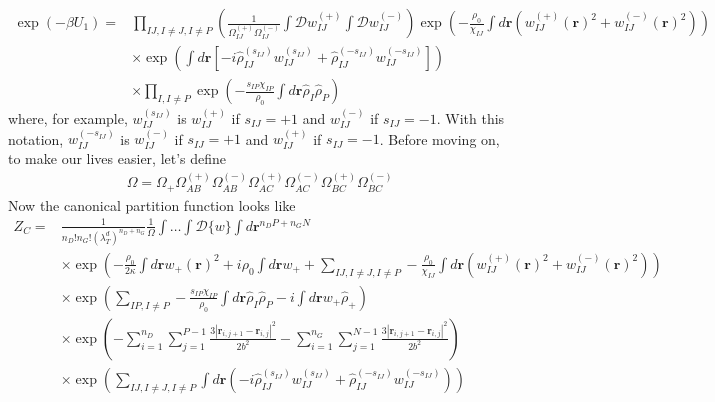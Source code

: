 \documentclass{article}
\begin{document}
\begin{align*}
  \exp (-\beta U_1) =&
    \prod_{IJ, I \ne J, I \ne P} \left(
      \frac{1}{\Omega_{IJ}^{(+)}\Omega_{IJ}^{(-)}}
      \int \mathcal{D} w_{IJ}^{(+)} \int \mathcal{D} w_{IJ}^{(-)}
    \right)
    \exp \left(
      -\frac{\rho_0}{\chi_{IJ}}
      \int d \mathbf{r} \left( 
        w_{IJ}^{(+)}(\mathbf{r})^2 + w_{IJ}^{(-)}(\mathbf{r})^2
      \right)
    \right) \\
    &\times
    \exp \left(
      \int d \mathbf{r} \left[ 
        - i \hat{\rho}_{IJ}^{(s_{IJ})} w_{IJ}^{(s_{IJ})}
        + \hat{\rho}_{IJ}^{(-s_{IJ})} w_{IJ}^{(-s_{IJ})}
      \right]
    \right) \\
    &\times
    \prod_{I, I \ne P} \exp \left(
      - \frac{s_{IP}\chi_{IP}}{\rho_0}
      \int d \mathbf{r} \hat{\rho}_I \hat{\rho}_P
    \right)
\end{align*}
where, for example, $w_{IJ}^{(s_{IJ})}$ is $w_{IJ}^{(+)}$ if $s_{IJ} = +1$ and
  $w_{IJ}^{(-)}$ if $s_{IJ} = -1$.
With this notation, $w_{IJ}^{(-s_{IJ})}$ is $w_{IJ}^{(-)}$ if $s_{IJ} = +1$ and
  $w_{IJ}^{(+)}$ if $s_{IJ} = -1$.
Before moving on, to make our lives easier, let's define
\begin{align*}
  \Omega =
    \Omega_+
    \Omega_{AB}^{(+)} \Omega_{AB}^{(-)}
    \Omega_{AC}^{(+)} \Omega_{AC}^{(-)}
    \Omega_{BC}^{(+)} \Omega_{BC}^{(-)}
\end{align*}
Now the canonical partition function looks like
\begin{align*}
  Z_C =& \frac{1}{n_D!n_G! \left( \lambda_T^d \right)^{n_D+n_G}}
    \frac{1}{\Omega}
    \int \hdots \int \mathcal{D} \{w\}
    \int d \mathbf{r}^{n_D P + n_G N} \\
    &\times
    \exp \left(
      - \frac{\rho_0}{2\kappa} \int d \mathbf{r} w_+(\mathbf{r})^2
      + i \rho_0 \int d\mathbf{r} w_+
      + \sum_{IJ,I \ne J, I \ne P}
      - \frac{\rho_0}{\chi_{IJ}}
      \int d \mathbf{r}
      \left(
        w_{IJ}^{(+)} (\mathbf{r})^2 + w_{IJ}^{(-)} (\mathbf{r})^2
      \right)
    \right) \\
    &\times
    \exp \left(
      \sum_{IP,I \ne P}
      - \frac{s_{IP}\chi_{IP}}{\rho_0}
      \int d \mathbf{r} \hat{\rho}_I \hat{\rho}_P
      - i\int d \mathbf{r} w_+ \hat{\rho}_+
    \right) \\
    &\times
    \exp \left(
      - \sum_{i=1}^{n_D} \sum_{j=1}^{P-1}
      \frac{3 \left| \mathbf{r}_{i,j+1} - \mathbf{r}_{i,j} \right| ^ 2 }
           { 2 b^2 }
      - \sum_{i=1}^{n_G} \sum_{j=1}^{N-1}
      \frac{3 \left| \mathbf{r}_{i,j+1} - \mathbf{r}_{i,j} \right| ^ 2 }
           { 2 b^2 } 
    \right) \\
    &\times
    \exp \left(
      \sum_{IJ, I \ne J, I \ne P}
      \int d \mathbf{r} \left(
        -i \hat{\rho}_{IJ}^{(s_{IJ})} w_{IJ}^{(s_{IJ})}
        + \hat{\rho}_{IJ}^{(-s_{IJ})} w_{IJ}^{(-s_{IJ})}
      \right)
    \right)
\end{align*}
\end{document}
